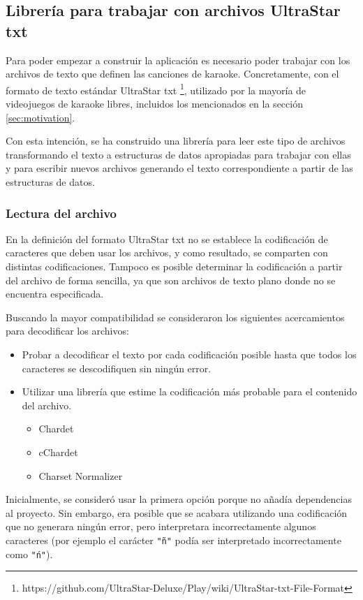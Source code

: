 \subsection{Librería para trabajar con archivos UltraStar txt}

Para poder empezar a construir la aplicación es necesario poder trabajar con los archivos de texto que definen las canciones de karaoke. Concretamente, con el formato de texto estándar UltraStar txt \footnote{https://github.com/UltraStar-Deluxe/Play/wiki/UltraStar-txt-File-Format},  utilizado por la mayoría de videojuegos de karaoke libres, incluidos los mencionados en la sección \ref{sec:motivation}.

Con esta intención, se ha construido una librería para leer este tipo de archivos transformando el texto a estructuras de datos apropiadas para trabajar con ellas y para escribir nuevos archivos generando el texto correspondiente a partir de las estructuras de datos.

\subsubsection{Lectura del archivo}

En la definición del formato UltraStar txt no se establece la codificación de caracteres que deben usar los archivos, y como resultado, se comparten con distintas codificaciones. Tampoco es posible determinar la codificación a partir del archivo de forma sencilla, ya que son archivos de texto plano donde no se encuentra especificada.

Buscando la mayor compatibilidad se consideraron los siguientes acercamientos para decodificar los archivos:

\begin{itemize}
	\item{Probar a decodificar el texto por cada codificación posible hasta que todos los caracteres se descodifiquen sin ningún error.}
	\item{Utilizar una librería que estime la codificación más probable para el contenido del archivo.}
	\begin{itemize}
		\item{Chardet}
		\item{cChardet}
		\item{Charset Normalizer}
	\end{itemize}
\end{itemize}

Inicialmente, se consideró usar la primera opción porque no añadía dependencias al proyecto. Sin embargo, era posible que se acabara utilizando una codificación que no generara ningún error, pero interpretara incorrectamente algunos caracteres (por ejemplo el carácter \texttt{"ñ"} podía ser interpretado incorrectamente como \texttt{"ń"}).

